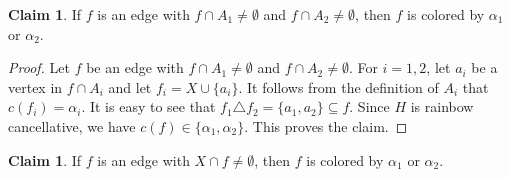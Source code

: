 \documentclass[10pt,a4paper]{article}
\theoremstyle{definition}
\newtheorem{claim}[theorem]{Claim}
\begin{document}
\begin{claim}\label{clm:crossing color}
    If $f$ is an edge with $f\cap A_1\ne\emptyset$ and $f\cap A_2\ne\emptyset$, then $f$ is colored by $\alpha_1$ or $\alpha_2$.
\end{claim}

\begin{proof}
    Let $f$ be an edge with $f\cap A_1\ne\emptyset$ and $f\cap A_2\ne\emptyset$.
    For $i=1,2$, let $a_i$ be a vertex in $f\cap A_i$ and let $f_i=X\cup\{a_i\}$.
    It follows from the definition of $A_i$ that $c(f_i)=\alpha_i$.
    It is easy to see that $f_1\triangle f_2=\{a_1,a_2\}\subseteq f$.
    Since $H$ is rainbow cancellative, we have $c(f)\in \{\alpha_1,\alpha_2\}$.
    This proves the claim.
\end{proof}

\begin{claim}\label{clm:X two colors}
    If $f$ is an edge with $X\cap f\ne\emptyset$, then $f$ is colored by $\alpha_1$ or $\alpha_2$.
\end{claim}
\end{document}
